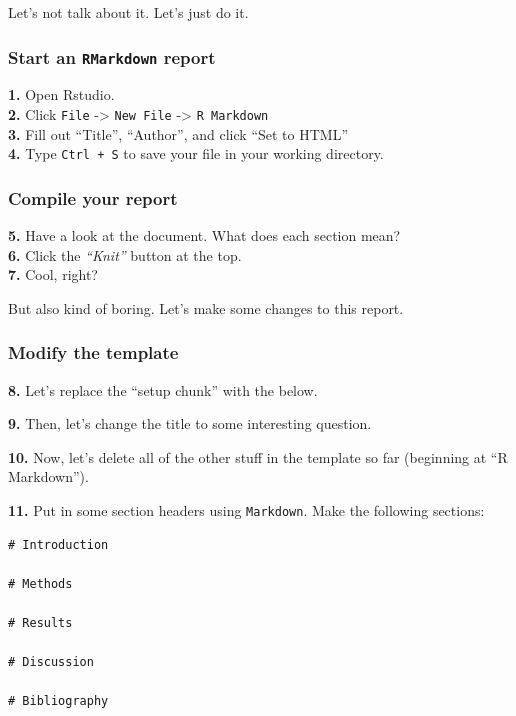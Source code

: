 \documentclass[
]{book}
\begin{document}
Let's not talk about it. Let's just do it.

\hypertarget{start-an-rmarkdown-report}{%
\subsubsection*{\texorpdfstring{Start an \texttt{RMarkdown} report}{Start an RMarkdown report}}\label{start-an-rmarkdown-report}}

\textbf{1.} Open Rstudio.\\
\textbf{2.} Click \texttt{File} -\textgreater{} \texttt{New\ File} -\textgreater{} \texttt{R\ Markdown}\\
\textbf{3.} Fill out ``Title'', ``Author'', and click ``Set to HTML''\\
\textbf{4.} Type \texttt{Ctrl\ +\ S} to save your file in your working directory.

\hypertarget{compile-your-report}{%
\subsubsection*{Compile your report}\label{compile-your-report}}

\textbf{5.} Have a look at the document. What does each section mean?\\
\textbf{6.} Click the \emph{``Knit''} button at the top.\\
\textbf{7.} Cool, right?

But also kind of boring. Let's make some changes to this report.

\hypertarget{modify-the-template}{%
\subsubsection*{Modify the template}\label{modify-the-template}}

\textbf{8.} Let's replace the ``setup chunk'' with the below.

\textbf{9.} Then, let's change the title to some interesting question.

\textbf{10.} Now, let's delete all of the other stuff in the template so far (beginning at ``R Markdown'').

\textbf{11.} Put in some section headers using \texttt{Markdown}. Make the following sections:

\begin{verbatim}
# Introduction

# Methods

# Results

# Discussion

# Bibliography
\end{verbatim}
\end{document}
